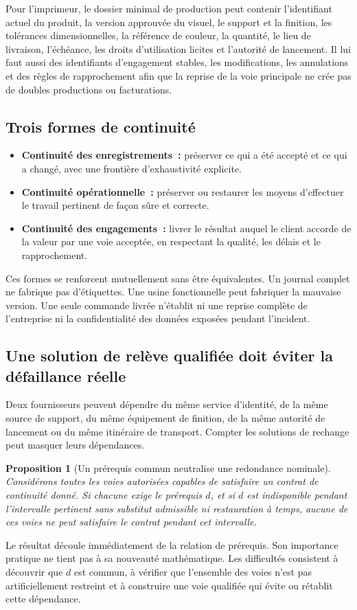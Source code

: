 \documentclass[11pt,a4paper]{article}
\newtheorem{proposition}{Proposition}
\begin{document}
Pour l’imprimeur, le dossier minimal de production peut contenir l’identifiant actuel du produit, la version approuvée du visuel, le support et la finition, les tolérances dimensionnelles, la référence de couleur, la quantité, le lieu de livraison, l’échéance, les droits d’utilisation licites et l’autorité de lancement. Il lui faut aussi des identifiants d’engagement stables, les modifications, les annulations et des règles de rapprochement afin que la reprise de la voie principale ne crée pas de doubles productions ou facturations.

\subsection{Trois formes de continuité}
\begin{itemize}
\item \textbf{Continuité des enregistrements~:} préserver ce qui a été accepté et ce qui a changé, avec une frontière d’exhaustivité explicite.
\item \textbf{Continuité opérationnelle~:} préserver ou restaurer les moyens d’effectuer le travail pertinent de façon sûre et correcte.
\item \textbf{Continuité des engagements~:} livrer le résultat auquel le client accorde de la valeur par une voie acceptée, en respectant la qualité, les délais et le rapprochement.
\end{itemize}
Ces formes se renforcent mutuellement sans être équivalentes. Un journal complet ne fabrique pas d’étiquettes. Une usine fonctionnelle peut fabriquer la mauvaise version. Une seule commande livrée n’établit ni une reprise complète de l’entreprise ni la confidentialité des données exposées pendant l’incident.

\subsection{Une solution de relève qualifiée doit éviter la défaillance réelle}
Deux fournisseurs peuvent dépendre du même service d’identité, de la même source de support, du même équipement de finition, de la même autorité de lancement ou du même itinéraire de transport. Compter les solutions de rechange peut masquer leurs dépendances.

\begin{proposition}[Un prérequis commun neutralise une redondance nominale]
Considérons toutes les voies autorisées capables de satisfaire un contrat de continuité donné. Si chacune exige le prérequis $d$, et si $d$ est indisponible pendant l’intervalle pertinent sans substitut admissible ni restauration à temps, aucune de ces voies ne peut satisfaire le contrat pendant cet intervalle.
\end{proposition}
Le résultat découle immédiatement de la relation de prérequis. Son importance pratique ne tient pas à sa nouveauté mathématique. Les difficultés consistent à découvrir que $d$ est commun, à vérifier que l’ensemble des voies n’est pas artificiellement restreint et à construire une voie qualifiée qui évite ou rétablit cette dépendance.
\end{document}
